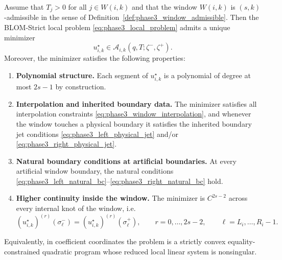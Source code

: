 \begin{theorem}
\label{thm:phase3_blom_strict_wellposedness}
Assume that \(T_j>0\) for all \(j\in W(i,k)\) and that the window \(W(i,k)\) is \((s,k)\)-admissible in the sense of Definition~\ref{def:phase3_window_admissible}.
Then the BLOM-Strict local problem \eqref{eq:phase3_local_problem} admits a unique minimizer
\[
u_{i,k}^\star \in \mathcal A_{i,k}(q,T;\zeta^-,\zeta^+).
\]
Moreover, the minimizer satisfies the following properties:

\begin{enumerate}
    \item \textbf{Polynomial structure.}
    Each segment of \(u_{i,k}^\star\) is a polynomial of degree at most \(2s-1\) by construction.

    \item \textbf{Interpolation and inherited boundary data.}
    The minimizer satisfies all interpolation constraints \eqref{eq:phase3_window_interpolation}, and whenever the window touches a physical boundary it satisfies the inherited boundary jet conditions \eqref{eq:phase3_left_physical_jet} and/or \eqref{eq:phase3_right_physical_jet}.

    \item \textbf{Natural boundary conditions at artificial boundaries.}
    At every artificial window boundary, the natural conditions
    \eqref{eq:phase3_left_natural_bc}--\eqref{eq:phase3_right_natural_bc} hold.

    \item \textbf{Higher continuity inside the window.}
    The minimizer is \(C^{2s-2}\) across every internal knot of the window, i.e.
    \begin{equation}
    \label{eq:phase3_high_continuity}
    (u_{i,k}^\star)^{(r)}(\sigma_\ell^-)
    =
    (u_{i,k}^\star)^{(r)}(\sigma_\ell^+),
    \qquad
    r=0,\dots,2s-2,
    \qquad
    \ell=L_i,\dots,R_i-1.
    \end{equation}
\end{enumerate}

Equivalently, in coefficient coordinates the problem is a strictly convex equality-constrained quadratic program whose reduced local linear system is nonsingular.
\end{theorem}

